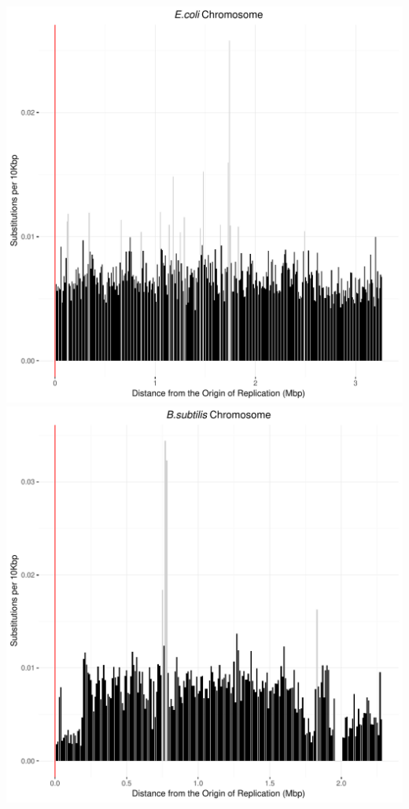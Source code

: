 \documentclass[12pt]{article}
\begin{document}
\includegraphics[width=\textwidth]{ecoli_weighted_subs_bidirectionality_colour_6Nov19.pdf}
\includegraphics[width=\textwidth]{bass_weighted_subs_bidirectionality_colour_6Nov19.pdf}
\end{document}
